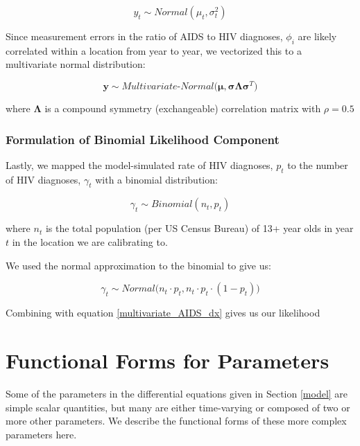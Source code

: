 \documentclass{article}
\begin{document}
\begin{equation}
	y_t \sim Normal(\mu_t, \sigma^2_t)
\end{equation}

Since measurement errors in the ratio of AIDS to HIV diagnoses, $\phi_i$ are likely correlated within a location from year to year, we vectorized this to a multivariate normal distribution: 

\begin{equation} \label{multivariate_AIDS_dx}
	\bm{y} \sim Multivariate\text{-}Normal\big(\bm{\mu}, \bm{\sigma} \bm{\Lambda} \bm{\sigma}^T \big)
\end{equation}

where $\bm{\Lambda}$ is a compound symmetry (exchangeable) correlation matrix with $\rho=0.5$

\subsubsection{Formulation of Binomial Likelihood Component}

Lastly, we mapped the model-simulated rate of HIV diagnoses, $p_t$ to the number of HIV diagnoses, $\gamma_t$ with a binomial distribution:

\begin{equation}
	\gamma_t \sim Binomial(n_t, p_t)
\end{equation}

where $n_t$ is the total population (per US Census Bureau) of 13+ year olds in year $t$ in the location we are calibrating to.

We used the normal approximation to the binomial to give us:

\begin{equation}
	\gamma_t \sim Normal\big(n_t \cdot p_t, n_t \cdot p_t \cdot (1-p_t)\big)
\end{equation}

Combining with equation \ref{multivariate_AIDS_dx} gives us our likelihood


\section{Functional Forms for Parameters} \label{functional_forms}

Some of the parameters in the differential equations given in Section \ref{model} are simple scalar quantities, but many are either time-varying or composed of two or more other parameters. We describe the functional forms of these more complex parameters here.
\end{document}
